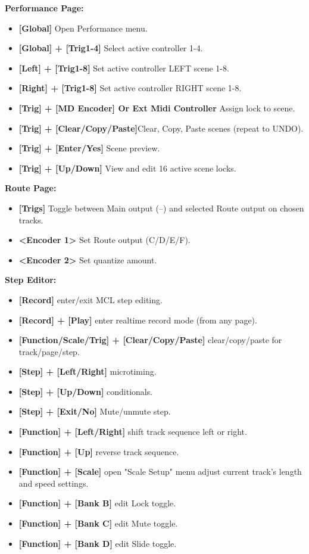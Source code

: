 \newpage
\textbf{Performance Page:}
\begin{itemize}
      \item \textbf{[Global]} Open Performance menu.
      \item \textbf{[Global] + [Trig1-4]} Select active controller 1-4.
      \item \textbf{[Left] + [Trig1-8]} Set active controller LEFT scene 1-8.
      \item \textbf{[Right] + [Trig1-8]} Set active controller RIGHT scene 1-8.
      \item \textbf{[Trig] + [MD Encoder] Or Ext Midi Controller} Assign lock to scene.
      \item \textbf{[Trig] + [Clear/Copy/Paste]}Clear, Copy, Paste scenes (repeat to UNDO).
      \item \textbf{[Trig] + [Enter/Yes]} Scene preview.
      \item \textbf{[Trig] + [Up/Down]} View and edit 16 active scene locks.
      \end{itemize}
   \textbf{Route Page:} 
\begin{itemize}

     \item \textbf{[Trigs] }Toggle between Main output (--) and selected Route output on chosen tracks.
     \item \textbf{<Encoder 1>} Set Route output (C/D/E/F).
     \item \textbf{<Encoder 2>} Set quantize amount.
     \end{itemize}
\textbf{Step Editor:}
\begin{itemize}
      \item \textbf{[Record]} enter/exit MCL step editing.
      \item \textbf{[Record] + [Play]} enter realtime record mode (from any page).
      \item \textbf{[Function/Scale/Trig] + [Clear/Copy/Paste]} clear/copy/paste for track/page/step.
      \item \textbf{[Step] + [Left/Right]} microtiming.
      \item \textbf{[Step] + [Up/Down]} conditionals.
      \item \textbf{[Step] + [Exit/No]} Mute/unmute step.
      \item \textbf{[Function] + [Left/Right]} shift track sequence left or right.
      \item \textbf{[Function] + [Up]} reverse track sequence.
      \item \textbf{[Function] + [Scale]} open "Scale Setup" menu adjust current track's length and speed settings.
      \item \textbf{[Function] + [Bank B]} edit Lock toggle.
      \item \textbf{[Function] + [Bank C]} edit Mute toggle.
      \item \textbf{[Function] + [Bank D]} edit Slide toggle.
\end{itemize}
